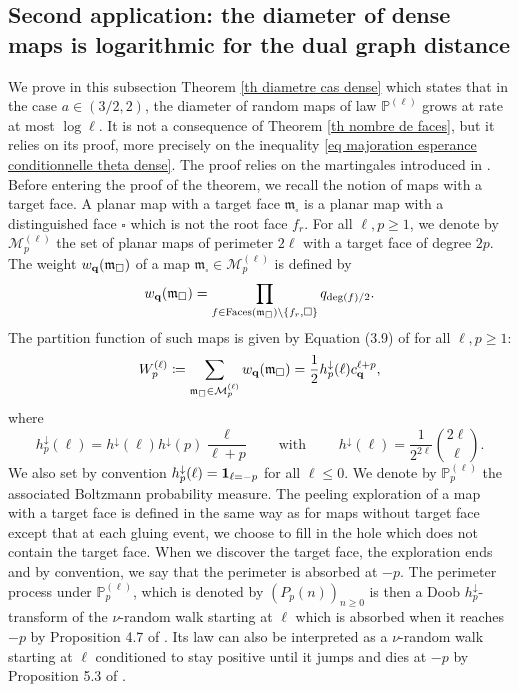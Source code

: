 \documentclass[11pt]{article}
\numberwithin{equation}{section}
\def\P{\mathbb{P}}
\begin{document}
\subsection{Second application: the diameter of dense maps is logarithmic for the dual graph distance}
We prove in this subsection Theorem \ref{th diametre cas dense} which states that in the case $a \in (3/2,2)$, the diameter of random maps of law $\P^{(\ell)}$ grows at rate at most $\log \ell$. It is not a consequence of Theorem \ref{th nombre de faces}, but it relies on its proof, more precisely on the inequality \eqref{eq majoration esperance conditionnelle theta dense}. 
The proof relies on the martingales introduced in \cite{Kam23}. Before entering the proof of the theorem, we recall the notion of maps with a target face. A planar map with a target face $\mathfrak{m}_\square$ is a planar map with a distinguished face $\square$ which is not the root face $f_r$. For all $\ell, p \ge 1$, we denote by $\mathcal{M}^{(\ell)}_p$ the set of planar maps of perimeter $2\ell$ with a target face of degree $2p$. The weight $w_{\bf q}(\mathfrak{m}_\square)$ of a map $\mathfrak{m}_\square \in \mathcal{M}^{(\ell)}_p$ is defined by
$$w_{\bf q}(\mathfrak{m}_\square)= \prod_{f \in \mathrm{Faces}(\mathfrak{m}_\square) \setminus \{f_r, \square\}} q_{\deg (f)/2}.$$
The partition function of such maps is given by Equation (3.9) of \cite{StFlour} for all $\ell, p \ge 1$:
$$
W^{(\ell)}_p \coloneqq \sum_{\mathfrak{m}_\square \in \mathcal{M}^{(\ell)}_p} w_{\bf q}(\mathfrak{m}_\square)
=
\frac{1}{2} h^\downarrow_p(\ell) c_{\bf q}^{\ell+p},
$$
where 
\begin{equation}\label{eq h p}
h^\downarrow_p(\ell) = h^\downarrow(\ell) h^\downarrow(p) \frac{\ell}{\ell +p} \qquad \text{with } \qquad 
h^\downarrow(\ell)  = \frac{1}{2^{2\ell}} \binom{2\ell}{\ell}.
\end{equation}
We also set by convention $h^\downarrow_p(\ell) = {\bf 1}_{\ell=-p}$ for all $\ell \le 0$. We denote by $\P^{(\ell)}_p$ the associated Boltzmann probability measure. The peeling exploration of a map with a target face is defined in the same way as for maps without target face except that at each gluing event, we choose to fill in the hole which does not contain the target face. When we discover the target face, the exploration ends and by convention, we say that the perimeter is absorbed at $-p$. The perimeter process under $\P^{(\ell)}_p$, which is denoted by $(P_p(n))_{n\ge 0}$ is then a Doob $h^\downarrow_p$-transform of the $\nu$-random walk starting at $\ell$ which is absorbed when it reaches $-p$ by Proposition 4.7 of \cite{StFlour}. Its law can also be interpreted as a $\nu$-random walk starting at $\ell$ conditioned to stay positive until it jumps and dies at $-p$ by Proposition 5.3 of \cite{StFlour}.
\end{document}
